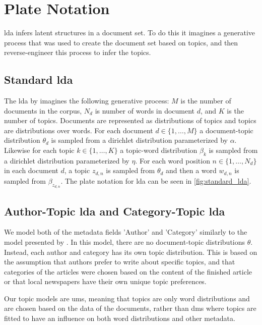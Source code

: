 \section{Plate Notation}
\Gls{lda} infers latent structures in a document set. 
To do this it imagines a generative process that was used to create the document set based on topics, and then reverse-engineer this process to infer the topics.

\subsection{Standard \gls{lda}}
The \gls{lda} by \citet{blei2003latent} imagines the following generative process:
$M$ is the number of documents in the corpus, $N_d$ is number of words in document $d$, and $K$ is the number of topics.
Documents are represented as distributions of topics and topics are distributions over words.
For each document $d \in \{1,\dots, M\}$ a document-topic distribution $\theta_d$ is sampled from a dirichlet distribution parameterized by $\alpha$.
Likewise for each topic $k \in \{1,\dots, K\}$ a topic-word distribution $\beta_k$ is sampled from a dirichlet distribution parameterized by $\eta$.
For each word position $n \in \{1, \dots, N_d\}$ in each document $d$, a topic $z_{d,n}$ is sampled from $\theta_d$ and then a word $w_{d,n}$ is sampled from $\beta_{z_{d,n}}$.
The plate notation for \gls{lda} can be seen in \autoref{fig:standard_lda}.



\subsection{Author-Topic \gls{lda} and Category-Topic \gls{lda}}
We model both of the metadata fields 'Author' and 'Category' similarly to the model presented by \citet{author_topic_2012}.
In this model, there are no document-topic distributions $\theta$.
Instead, each author and category has its own topic distribution.
This is based on the assumption that authors prefer to write about specific topics, and that categories of the articles were chosen based on the content of the finished article or that local newspapers have their own unique topic preferences.

Our topic models are \glspl{um}, meaning that topics are only word distributions and are chosen based on the data of the documents, rather than \glspl{dm} where topics are fitted to have an influence on both word distributions and other metadata.

